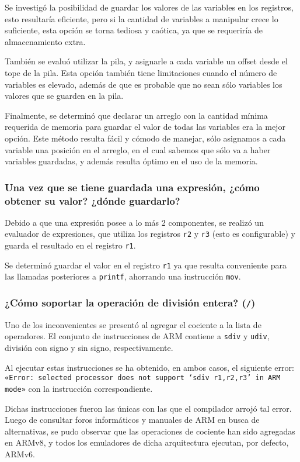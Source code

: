 \documentclass[12pt,spanish]{article}
\begin{document}
Se investigó la posibilidad de guardar los valores de las variables en los registros, esto resultaría eficiente, pero si la cantidad de variables a manipular crece lo suficiente, esta opción se torna tediosa y caótica, ya que se requeriría de almacenamiento extra.

También se evaluó utilizar la pila, y asignarle a cada variable un offset desde el tope de la pila. Esta opción también tiene limitaciones cuando el número de variables es elevado, además de que es probable que no sean sólo variables los valores que se guarden en la pila.

Finalmente, se determinó que declarar un arreglo con la cantidad mínima requerida de memoria para guardar el valor de todas las variables era la mejor opción. Este método resulta fácil y cómodo de manejar, sólo asignamos a cada variable una posición en el arreglo, en el cual sabemos que sólo va a haber variables guardadas, y además resulta óptimo en el uso de la memoria.

\subsubsection{Una vez que se tiene guardada una expresión, ¿cómo obtener su valor? ¿dónde guardarlo?}

Debido a que una expresión posee a lo más 2 componentes, se realizó un evaluador de expresiones, que utiliza los registros \texttt{r2} y \texttt{r3} (esto es configurable) y guarda el resultado en el registro \texttt{r1}.

Se determinó guardar el valor en el registro \texttt{r1} ya que resulta conveniente para las llamadas posteriores a \texttt{printf}, ahorrando una instrucción \texttt{mov}.

\subsubsection{¿Cómo soportar la operación de división entera? (\texttt{/})}

Uno de los inconvenientes se presentó al agregar el cociente a la lista de operadores. El conjunto de instrucciones de ARM contiene a \texttt{sdiv} y \texttt{udiv}, división con signo y sin signo, respectivamente. 

Al ejecutar estas instrucciones se ha obtenido, en ambos casos, el siguiente error: \texttt{«Error: selected processor does not support `sdiv r1,r2,r3' in ARM mode»} con la instrucción correspondiente.

Dichas instrucciones fueron las únicas con las que el compilador arrojó tal error. Luego de consultar foros informáticos y manuales de ARM en busca de alternativas, se pudo observar que las operaciones de cociente han sido agregadas en ARMv8, y todos los emuladores de dicha arquitectura ejecutan, por defecto, ARMv6. 
\end{document}
